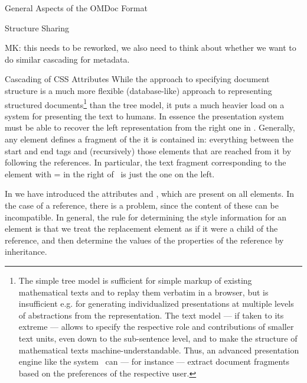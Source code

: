 \begin{tchapter}[id=spec-intro]{General Aspects of the OMDoc Format}
\begin{tsection}[id=sharing,short=Structure Sharing]{Structure Sharing}
\begin{oldpart}{MK: this needs to be reworked, we also need to think about whether we want
    to do similar cascading for metadata.}
\begin{tsubsection}[id=tref-css-cascading]{Cascading of CSS Attributes}
  While the {\omdoc} approach to specifying document structure is a much more flexible
  (database-like) approach to representing structured documents\footnote{The simple tree
    model is sufficient for simple markup of existing mathematical texts and to replay
    them verbatim in a browser, but is insufficient e.g. for generating individualized
    presentations at multiple levels of abstractions from the representation. The {\omdoc}
    text model --- if taken to its extreme --- allows to specify the respective role and
    contributions of smaller text units, even down to the sub-sentence level, and to make
    the structure of mathematical texts machine-understandable. Thus, an advanced
    presentation engine like the {\activemath} system~\cite{SieBen:acgap00} can --- for
    instance --- extract document fragments based on the preferences of the respective
    user.}  than the tree model, it puts a much heavier load on a system for presenting
  the text to humans. In essence the presentation system must be able to recover the left
  representation from the right one in {}.  Generally, any {\omdoc}
  element defines a fragment of the {\omdoc} it is contained in: everything between the
  start and end tags and (recursively) those elements that are reached from it by
  following the {\omdoc} references.  In particular, the text fragment corresponding to
  the element with {}={} in the right
  {\omdoc} of~ is just the one on the left.

  In {} we have introduced the {\css}
  attributes {} and {},
  which are present on all {\omdoc} elements. In the case of a {\omdoc} reference, there
  is a problem, since the content of these can be incompatible. In general, the rule for
  determining the style information for an element is that we treat the replacement
  element as if it were a child of the reference, and then determine the values of the
  {\css} properties of the {\omdoc} reference by inheritance.
\end{tsubsection}
\end{oldpart}
\end{tsection}

\end{tchapter}


